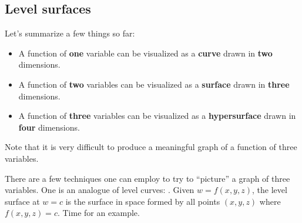 \documentclass{ximera}
\begin{document}


\subsection{Level surfaces}
Let's summarize a few things so far:

\begin{itemize}
  \item A function of \textbf{one} variable can be visualized as a \textbf{curve} drawn
    in \textbf{two} dimensions.
  \item A function of \textbf{two} variables can be visualized as a \textbf{surface}
    drawn in \textbf{three} dimensions.
  \item A function of \textbf{three} variables can be visualized as a
    \textbf{hypersurface} drawn in \textbf{four} dimensions.
\end{itemize}

Note that it is very difficult to produce a meaningful graph of a function of
three variables.

There are a few techniques one can employ to try to ``picture'' a
graph of three variables. One is an analogue of level curves:
. Given $w=f(x,y,z)$, the level surface at $w=c$
is the surface in space formed by all points $(x,y,z)$ where
$f(x,y,z)=c$. Time for an example.
\end{document}
